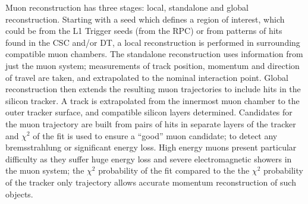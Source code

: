 Muon reconstruction has three stages: local, standalone and global reconstruction.
Starting with a seed which defines a region of interest, which could be from the \ac{L1} Trigger seeds (from the \ac{RPC}) or from patterns of hits found in the \ac{CSC} and/or \ac{DT},
a local reconstruction is performed in surrounding compatible muon chambers.
The standalone reconstruction uses information from just the muon system;
measurements of track position, momentum and direction of travel are taken, and extrapolated to the nominal interaction point. 
Global reconstruction then extends the resulting muon trajectories to include hits in the silicon tracker. A track is extrapolated from the innermost muon chamber to the outer tracker surface, and compatible silicon layers determined.
Candidates for the muon trajectory are built from pairs of hits in separate layers of the tracker 
and $\chi^{2}$ of the fit is used to ensure a ``good'' muon candidate; to detect any bremsstrahlung or significant energy loss. 
High energy muons present particular difficulty as they suffer huge energy loss and severe electromagnetic showers in the muon system; the $\chi^{2}$ probability of the fit compared to the the $\chi^{2}$ probability of the tracker only trajectory allows accurate momentum reconstruction of such objects. 








